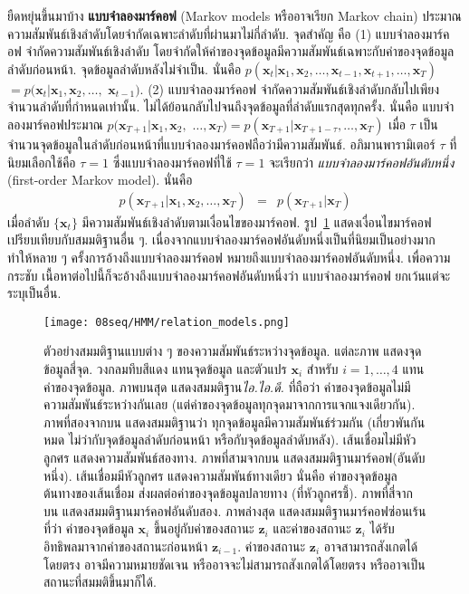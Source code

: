 ยืดหยุ่นขึ้นมาบ้าง \textbf{แบบจำลองมาร์คอฟ} (Markov models หรืออาจเรียก Markov chain)
ประมาณความสัมพันธ์เชิงลำดับโดยจำกัดเฉพาะลำดับที่ผ่านมาไม่กี่ลำดับ.
จุดสำคัญ คือ (1) แบบจำลองมาร์คอฟ จำกัดความสัมพันธ์เชิงลำดับ โดยจำกัดให้ค่าของจุดข้อมูลมีความสัมพันธ์เฉพาะกับค่าของจุดข้อมูลลำดับก่อนหน้า.
จุดข้อมูลลำดับหลังไม่จำเป็น.
นั่นคือ $p(\bm{x}_t| \bm{x}_1, \bm{x}_2, \ldots, \bm{x}_{t-1}, \bm{x}_{t+1}, \ldots, \bm{x}_T)$
$=p(\bm{x}_t| \bm{x}_1, \bm{x}_2, \ldots,$ $\bm{x}_{t-1})$.
(2) แบบจำลองมาร์คอฟ จำกัดความสัมพันธ์เชิงลำดับกลับไปเพียงจำนวนลำดับที่กำหนดเท่านั้น.
ไม่ได้ย้อนกลับไปจนถึงจุดข้อมูลที่ลำดับแรกสุดทุกครั้ง.
นั่นคือ แบบจำลองมาร์คอฟประมาณ 
$p(\bm{x}_{T+1}|\bm{x}_1, \bm{x}_2,$ $\ldots, \bm{x}_T) 
=
p(\bm{x}_{T+1}|\bm{x}_{T+1-\tau}, \ldots, \bm{x}_T)$
เมื่อ $\tau$ เป็นจำนวนจุดข้อมูลในลำดับก่อนหน้าที่แบบจำลองมาร์คอฟถือว่ามีความสัมพันธ์.
อภิมานพารามิเตอร์ $\tau$ ที่นิยมเลือกใช้คือ $\tau = 1$
ซึ่งแบบจำลองมาร์คอฟที่ใช้ $\tau = 1$ จะเรียกว่า \textit{แบบจำลองมาร์คอฟอันดับหนึ่ง} (first-order Markov model).
นั่นคือ 
\begin{eqnarray}
p(\bm{x}_{T+1}|\bm{x}_1, \bm{x}_2, \ldots, \bm{x}_T) 
&=&
p(\bm{x}_{T+1}|\bm{x}_T)
\label{eq: seq first-order markov criteria} 
\end{eqnarray}
เมื่อลำดับ $\{\bm{x}_t\}$ มีความสัมพันธ์เชิงลำดับตามเงื่อนไขของมาร์คอฟ.
รูป~\ref{fig: seq relation models} แสดงเงื่อนไขมาร์คอฟ เปรียบเทียบกับสมมติฐานอื่น ๆ.
เนื่องจากแบบจำลองมาร์คอฟอันดับหนึ่งเป็นที่นิยมเป็นอย่างมาก 
ทำให้หลาย ๆ ครั้งการอ้างถึงแบบจำลองมาร์คอฟ หมายถึงแบบจำลองมาร์คอฟอันดับหนึ่ง.
เพื่อความกระชับ 
เนื้อหาต่อไปนี้ก็จะอ้างถึงแบบจำลองมาร์คอฟอันดับหนึ่งว่า แบบจำลองมาร์คอฟ ยกเว้นแต่จะระบุเป็นอื่น.

%
\begin{figure}
	\begin{center}
		\texttt{[image: 08seq/HMM/relation\_models.png]}	
		\caption[ตัวอย่างสมมติฐานแบบต่าง ๆ ของความสัมพันธ์ระหว่างจุดข้อมูล]{ตัวอย่างสมมติฐานแบบต่าง ๆ ของความสัมพันธ์ระหว่างจุดข้อมูล. 
		แต่ละภาพ แสดงจุดข้อมูลสี่จุด.
		วงกลมทึบสีแดง แทนจุดข้อมูล และตัวแปร $\bm{x}_i$ สำหรับ $i = 1,\ldots,4$ แทนค่าของจุดข้อมูล.		
		ภาพบนสุด แสดงสมมติฐาน\textit{ไอ.ไอ.ดี.} ที่ถือว่า ค่าของจุดข้อมูลไม่มีความสัมพันธ์ระหว่างกันเลย (แต่ค่าของจุดข้อมูลทุกจุดมาจากการแจกแจงเดียวกัน).
		ภาพที่สองจากบน แสดงสมมติฐานว่า ทุกจุดข้อมูลมีความสัมพันธ์ร่วมกัน (เกี่ยวพันกันหมด ไม่ว่ากับจุดข้อมูลลำดับก่อนหน้า หรือกับจุดข้อมูลลำดับหลัง).
		เส้นเชื่อมไม่มีหัวลูกศร แสดงความสัมพันธ์สองทาง.
		ภาพที่สามจากบน แสดงสมมติฐานมาร์คอฟ(อันดับหนึ่ง).
		เส้นเชื่อมมีหัวลูกศร แสดงความสัมพันธ์ทางเดียว นั่นคือ ค่าของจุดข้อมูลต้นทางของเส้นเชื่อม ส่งผลต่อค่าของจุดข้อมูลปลายทาง (ที่หัวลูกศรชี้).
		ภาพที่สี่จากบน แสดงสมมติฐานมาร์คอฟอันดับสอง.
		ภาพล่างสุด แสดงสมมติฐานมาร์คอฟซ่อนเร้น ที่ว่า ค่าของจุดข้อมูล $\bm{x}_i$ ขึ้นอยู่กับค่าของสถานะ $\bm{z}_i$
		และค่าของสถานะ $\bm{z}_i$ ได้รับอิทธิพลมาจากค่าของสถานะก่อนหน้า $\bm{z}_{i-1}$.
		ค่าของสถานะ $\bm{z}_i$ อาจสามารถสังเกตได้โดยตรง อาจมีความหมายชัดเจน หรืออาจจะไม่สามารถสังเกตได้โดยตรง หรืออาจเป็นสถานะที่สมมติขึ้นมาก็ได้.
		}
		\label{fig: seq relation models}
	\end{center}
\end{figure}
%

